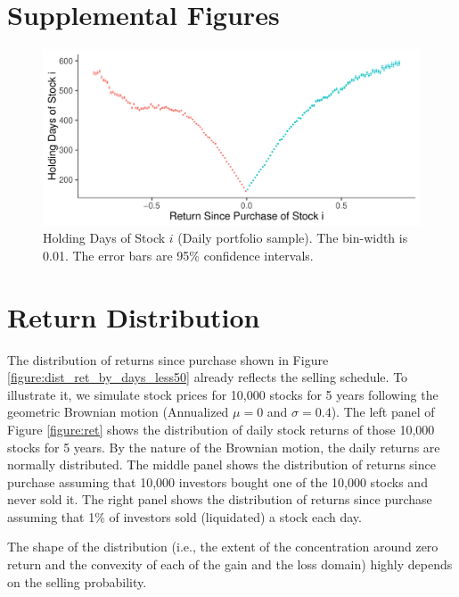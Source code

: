 \documentclass[11pt, a4paper]{article}
\begin{document}
\begin{appendices}
\section{Supplemental Figures}

\begin{figure}[H]
	\centering
	\includegraphics[width=0.8\columnwidth]{barc_holding_days_daily_NG_NL.pdf}
	\caption{Holding Days of Stock $i$ (Daily portfolio sample). The bin-width is 0.01. The error bars are 95\% confidence intervals.}
	\label{figure:holding_days}
\end{figure}


\section{Return Distribution}
\label{section:ret}
The distribution of returns since purchase shown in Figure \ref{figure:dist_ret_by_days_less50} already reflects the selling schedule. To illustrate it, we simulate stock prices for 10,000 stocks for 5 years following the geometric Brownian motion (Annualized $\mu=0$ and $\sigma=0.4$). The left panel of Figure \ref{figure:ret} shows the distribution of daily stock returns of those 10,000 stocks for 5 years. By the nature of the Brownian motion, the daily returns are normally distributed. The middle panel shows the distribution of returns since purchase assuming that 10,000 investors bought one of the 10,000 stocks and never sold it. The right panel shows the distribution of returns since purchase assuming that 1\% of investors sold (liquidated) a stock each day. 

The shape of the distribution (i.e., the extent of the concentration around zero return and the convexity of each of the gain and the loss domain) highly depends on the selling probability.




\end{appendices}
\end{document}
